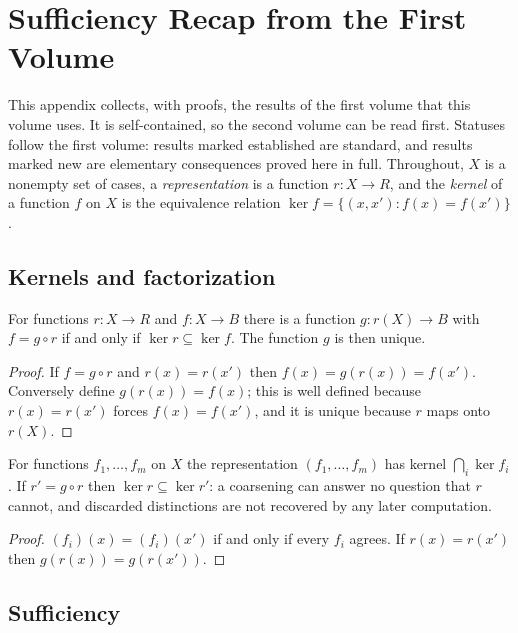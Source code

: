 \chapter{Sufficiency Recap from the First Volume}\label{app:suff}

This appendix collects, with proofs, the results of the first volume that this volume uses. It is self-contained, so the second volume can be read first. Statuses follow the first volume: results marked established are standard, and results marked new are elementary consequences proved here in full. Throughout, $X$ is a nonempty set of cases, a \emph{representation} is a function $r:X\to R$, and the \emph{kernel} of a function $f$ on $X$ is the equivalence relation $\ker f=\{(x,x'):f(x)=f(x')\}$.

\section{Kernels and factorization}

\begin{established}[Factorization]\label{a:factor}
For functions $r:X\to R$ and $f:X\to B$ there is a function $g:r(X)\to B$ with $f=g\circ r$ if and only if $\ker r\subseteq\ker f$. The function $g$ is then unique.
\end{established}
\begin{proof}
If $f=g\circ r$ and $r(x)=r(x')$ then $f(x)=g(r(x))=f(x')$. Conversely define $g(r(x))=f(x)$; this is well defined because $r(x)=r(x')$ forces $f(x)=f(x')$, and it is unique because $r$ maps onto $r(X)$.
\end{proof}

\begin{established}\label{a:joint}
For functions $f_1,\dots,f_m$ on $X$ the representation $(f_1,\dots,f_m)$ has kernel $\bigcap_i\ker f_i$. If $r'=g\circ r$ then $\ker r\subseteq\ker r'$: a coarsening can answer no question that $r$ cannot, and discarded distinctions are not recovered by any later computation.
\end{established}
\begin{proof}
$(f_i)(x)=(f_i)(x')$ if and only if every $f_i$ agrees. If $r(x)=r(x')$ then $g(r(x))=g(r(x'))$.
\end{proof}

\section{Sufficiency}

